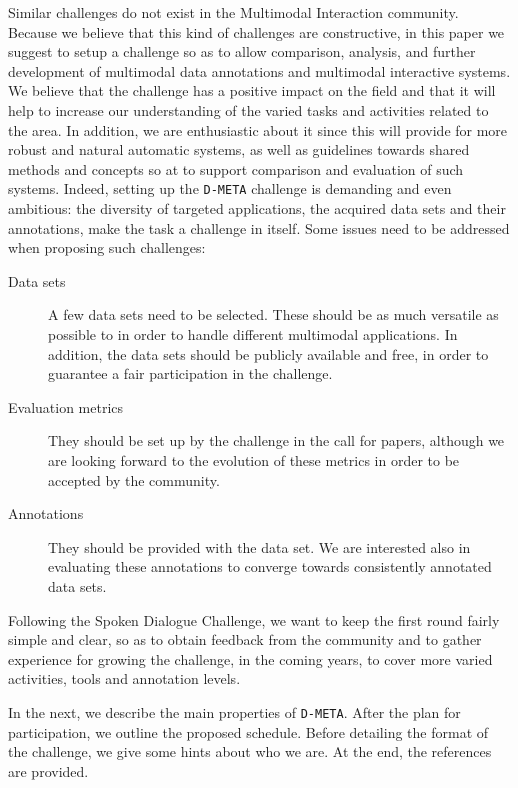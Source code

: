 \documentclass{sig-alternate}
\begin{document}
Similar challenges do not exist in the Multimodal Interaction community. Because we believe that this kind of
challenges are constructive, in this paper we suggest to setup a challenge so as to allow comparison,
analysis, and further development of multimodal data annotations and multimodal interactive systems. We believe that the
challenge has a positive impact on the field and that it will help to increase our understanding of the varied tasks and
activities related to the area. In addition, we are enthusiastic about it since this will provide for more robust and 
natural automatic systems, as well as guidelines towards shared methods and concepts so at to support comparison and
evaluation of such systems. Indeed, setting up the \texttt{D-META} challenge is demanding and even ambitious: the
diversity of targeted applications, the acquired data sets and their annotations, make the task a challenge in itself.
Some issues need to be addressed when proposing such challenges:
\begin{description}
 \item [Data sets] A few data sets need to be selected. These should be as much versatile as possible to in order to
handle different multimodal applications. In addition, the data sets should be publicly available and free, in order to
guarantee a fair participation in the challenge.
 \item [Evaluation metrics] They should be set up by the challenge in the call for papers, although we are looking
forward to the evolution of these metrics in order to be accepted by the community.
 \item [Annotations] They should be provided with the data set. We are interested also in evaluating these annotations
to converge towards consistently annotated data sets.
\end{description}

Following the Spoken Dialogue Challenge, we want to keep the first round fairly simple and clear, so as to obtain
feedback from the community and to gather experience for growing the challenge, in the coming years, to cover more
varied activities, tools and annotation levels.\vspace{0.4cm}

In the next, we describe the main properties of \texttt{D-META}. After the plan for participation, we outline
the proposed schedule. Before detailing the format of the challenge, we give some hints about who we are. At the end,
the references are provided.
\end{document}
